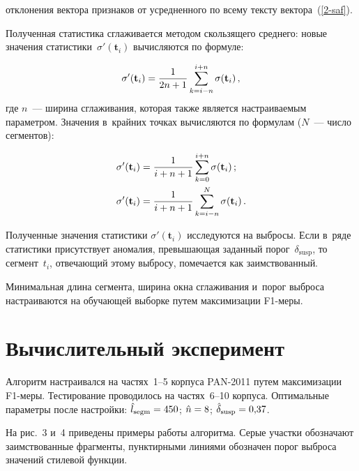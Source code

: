 \begin{multicols}{2}
\columnbreak

\noindent
 отклонения вектора признаков от 
усредненного по всему тексту вектора~(\ref{2-saf}).

Полученная статистика сглаживается методом скользящего среднего: новые значения 
статистики~$\sigma'(\mathbf{t}_i)$ вычисляются по формуле:

\noindent
$$
\sigma'(\mathbf{t}_i) = \displaystyle\frac{\displaystyle 1\mathstrut}{\displaystyle 2n+1\mathstrut}\sum\limits_{k=i-
n}^{i+n}\sigma(\mathbf{t}_i)\,,
$$
где $n$~--- ширина сглаживания, которая также является настраиваемым параметром. 
Значения в~крайних точках вычисляются по формулам ($N$~--- число сегментов):

\noindent
\begin{align*}
\sigma'(\mathbf{t}_i) &= 
\displaystyle\frac{\displaystyle 1\mathstrut}{\displaystyle i+n+1\mathstrut}\sum\limits_{k=0}^{i+n}\sigma(\mathbf{t}_i)\,;
\\
\sigma'(\mathbf{t}_i)& = \displaystyle\frac{\displaystyle 1\mathstrut}{\displaystyle i+n+1\mathstrut}\sum\limits_{k=i- n}^{N}\sigma(\mathbf{t}_i)\,.
\end{align*}

Полученные значения статистики $\sigma'(\mathbf{t}_i)$ исследуются на выбросы. 
Если в~ряде статистики присутствует аномалия, превышающая заданный 
порог~$\delta_{\mathrm{susp}}$, то сегмент~$t_i$, отвечающий этому выбросу, помечается как 
заимствованный.

Минимальная длина сегмента, ширина окна сглаживания и~порог выброса 
настраиваются на обучающей выборке путем максимизации {F1-меры}.

\vspace*{-6pt}

\section{Вычислительный эксперимент}

Алгоритм настраивался на частях~1--5 корпуса PAN-2011 путем максимизации 
{F1-ме\-ры}. Тестирование проводилось на частях~6--10 корпуса.
Оптимальные параметры после настройки: $\hat{l}_{\mathrm{segm}}\hm=450$; $\hat{n}\hm=8$; 
$\hat{\delta}_{\mathrm{susp}}\hm=0{,}37$.



На рис.~3 и~4 приведены примеры работы алгоритма. Серые участки обозначают 
заимствованные %
 фрагменты, пунктирными линиями обозначен порог выброса значений стилевой 
функции.


\end{multicols}

